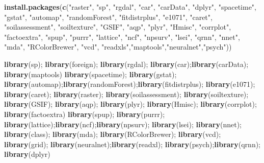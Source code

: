 \documentclass[
  10pt,
  b5paper,
]{book}
\newenvironment{Shaded}{\begin{snugshade}}{\end{snugshade}}
\newcommand{\KeywordTok}[1]{\textcolor[rgb]{0.13,0.29,0.53}{\textbf{#1}}}
\newcommand{\NormalTok}[1]{#1}
\newcommand{\StringTok}[1]{\textcolor[rgb]{0.31,0.60,0.02}{#1}}
\begin{document}
\begin{Shaded}
\begin{Highlighting}[]
\KeywordTok{install.packages}\NormalTok{(}\KeywordTok{c}\NormalTok{(}\StringTok{"raster"}\NormalTok{, }\StringTok{"sp"}\NormalTok{, }\StringTok{"rgdal"}\NormalTok{, }\StringTok{"car"}\NormalTok{, }\StringTok{"carData"}\NormalTok{, }\StringTok{"dplyr"}\NormalTok{, }\StringTok{"spacetime"}\NormalTok{, }\StringTok{"gstat"}\NormalTok{, }\StringTok{"automap"}\NormalTok{, }\StringTok{"randomForest"}\NormalTok{, }\StringTok{"fitdistrplus"}\NormalTok{, }\StringTok{"e1071"}\NormalTok{, }\StringTok{"caret"}\NormalTok{, }\StringTok{"soilassessment"}\NormalTok{, }\StringTok{"soiltexture"}\NormalTok{, }\StringTok{"GSIF"}\NormalTok{, }\StringTok{"aqp"}\NormalTok{, }\StringTok{"plyr"}\NormalTok{, }\StringTok{"Hmisc"}\NormalTok{, }\StringTok{"corrplot"}\NormalTok{, }\StringTok{"factoextra"}\NormalTok{, }\StringTok{"spup"}\NormalTok{, }\StringTok{"purrr"}\NormalTok{, }\StringTok{"lattice"}\NormalTok{, }\StringTok{"ncf"}\NormalTok{, }\StringTok{"npsurv"}\NormalTok{, }\StringTok{"lsei"}\NormalTok{, }\StringTok{"qrnn"}\NormalTok{, }\StringTok{"nnet"}\NormalTok{, }\StringTok{"mda"}\NormalTok{, }\StringTok{"RColorBrewer"}\NormalTok{, }\StringTok{"vcd"}\NormalTok{, }\StringTok{"readxls"}\NormalTok{,}\StringTok{"maptools"}\NormalTok{,}\StringTok{"neuralnet"}\NormalTok{,}\StringTok{"psych"}\NormalTok{))}

\KeywordTok{library}\NormalTok{(sp); }\KeywordTok{library}\NormalTok{(foreign); }\KeywordTok{library}\NormalTok{(rgdal); }\KeywordTok{library}\NormalTok{(car);}\KeywordTok{library}\NormalTok{(carData); }\KeywordTok{library}\NormalTok{(maptools) }\KeywordTok{library}\NormalTok{(spacetime); }\KeywordTok{library}\NormalTok{(gstat); }\KeywordTok{library}\NormalTok{(automap);}\KeywordTok{library}\NormalTok{(randomForest);}\KeywordTok{library}\NormalTok{(fitdistrplus); }\KeywordTok{library}\NormalTok{(e1071); }\KeywordTok{library}\NormalTok{(caret); }\KeywordTok{library}\NormalTok{(raster); }\KeywordTok{library}\NormalTok{(soilassessment); }\KeywordTok{library}\NormalTok{(soiltexture); }\KeywordTok{library}\NormalTok{(GSIF); }\KeywordTok{library}\NormalTok{(aqp); }\KeywordTok{library}\NormalTok{(plyr); }\KeywordTok{library}\NormalTok{(Hmisc); }\KeywordTok{library}\NormalTok{(corrplot); }\KeywordTok{library}\NormalTok{(factoextra) }\KeywordTok{library}\NormalTok{(spup); }\KeywordTok{library}\NormalTok{(purrr); }\KeywordTok{library}\NormalTok{(lattice);}\KeywordTok{library}\NormalTok{(ncf);}\KeywordTok{library}\NormalTok{(npsurv); }\KeywordTok{library}\NormalTok{(lsei); }\KeywordTok{library}\NormalTok{(nnet); }\KeywordTok{library}\NormalTok{(class); }\KeywordTok{library}\NormalTok{(mda); }\KeywordTok{library}\NormalTok{(RColorBrewer); }\KeywordTok{library}\NormalTok{(vcd); }\KeywordTok{library}\NormalTok{(grid); }\KeywordTok{library}\NormalTok{(neuralnet);}\KeywordTok{library}\NormalTok{(readxl); }\KeywordTok{library}\NormalTok{(psych);}\KeywordTok{library}\NormalTok{(qrnn); }\KeywordTok{library}\NormalTok{(dplyr)}
\end{Highlighting}
\end{Shaded}
\end{document}
